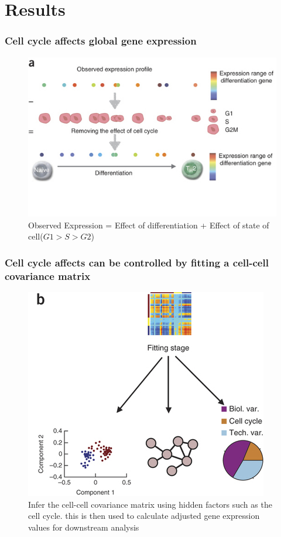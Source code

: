 \documentclass[10pt, compress]{beamer}
\renewcommand{\(}{\begin{columns}}
\renewcommand{\)}{\end{columns}}
\newcommand{\<}[1]{\begin{column}{#1}}
\renewcommand{\>}{\end{column}}
\begin{document}
\section{Results}
\begin{frame}
\frametitle{Cell cycle affects global gene expression}
\begin{figure}
\includegraphics[width=0.8\linewidth]{images/expression.jpg}
\caption{Observed Expression = Effect of differentiation + Effect of state of cell($G1 > S > G2$)}
\end{figure}
\end{frame}

\begin{frame}
\frametitle{Cell cycle affects can be controlled by fitting a cell-cell covariance matrix}
\begin{figure}
\includegraphics[width=0.8\linewidth]{images/fitting.jpg}
\caption{Infer the cell-cell covariance matrix using hidden factors such as the cell cycle. this is then used to calculate adjusted
gene expression values for downstream analysis}
\end{figure}
\end{frame}
\end{document}
